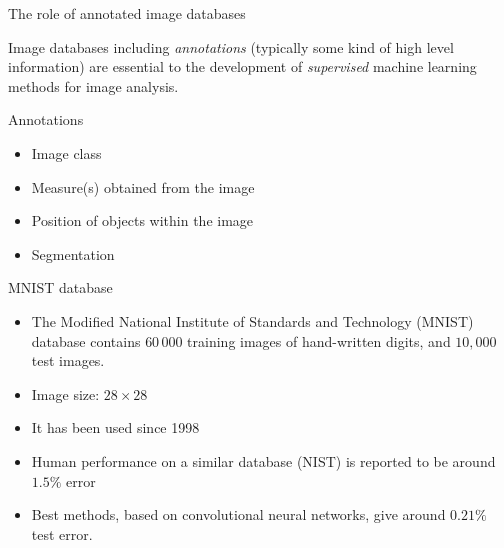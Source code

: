 \documentclass[handout,xcolor=pdftex,dvipsnames,table,mathserif]{beamer}
\begin{document}
\begin{frame}{The role of annotated image databases}

  Image databases including \emph{annotations} (typically some kind of high level information) are essential to the development of \emph{supervised} machine learning methods for image analysis.

  \begin{block}{Annotations}
    \begin{itemize}
    \item Image class
    \item Measure(s) obtained from the image
    \item Position of objects within the image
    \item Segmentation
    \end{itemize}
  \end{block}

\end{frame}

\begin{frame}{MNIST database \tiny{\cite{lecun_gradient-based_1998}}}

  \begin{itemize}
  \item The Modified National Institute of Standards and Technology (MNIST) database contains $60\,000$ training images of hand-written digits, and $10,000$ test images.
  \item Image size: $28 \times 28$
  \item It has been used since 1998
  \item Human performance on a similar database (NIST) is reported to be around $1.5\%$ error \cite{simard_efficient_1993}
  \item Best methods, based on convolutional neural networks, give around $0.21\%$ test error.
  \end{itemize}

\end{frame}
\end{document}
